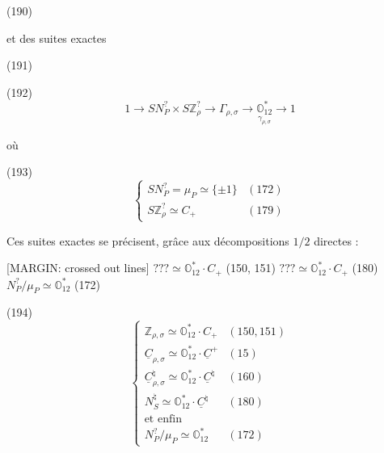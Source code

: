 \newpage


(190)

et des suites exactes

(191)

(192)
$$1 \to S N^?_P \times S\mathbb{Z}^?_\rho \to \Gamma_{\rho,\sigma} \to \underset{\gamma_{\rho,\sigma}}{\mathbb{O}_{12}^*} \to 1$$

où

(193)
$$ \begin{cases} S N^?_P = \mu_P \simeq \{\pm 1\} & (172) \\ S\mathbb{Z}^?_\rho \simeq C_+ & (179) \end{cases} $$

Ces suites exactes se précisent, grâce
aux décompositions $1/2$ directes :

[MARGIN: crossed out lines]
$??? \simeq \mathbb{O}_{12}^* \cdot C_+$ (150, 151)
$??? \simeq \mathbb{O}_{12}^* \cdot C_+$ (180)
$N^?_P / \mu_P \simeq \mathbb{O}_{12}^*$ (172)

(194)
$$ \begin{cases} \mathbb{Z}_{\rho,\sigma} \simeq \mathbb{O}_{12}^* \cdot C_+ & (150, 151) \\ \underline{C}_{\rho,\sigma} \simeq \mathbb{O}_{12}^* \cdot \underline{C}^+ & (15) \\ \underline{C}^\natural_{\rho,\sigma} \simeq \mathbb{O}_{12}^* \cdot \underline{C}^\natural & (160) \\ N^\natural_S \simeq \mathbb{O}_{12}^* \cdot \underline{C}^\natural & (180) \\ \text{et enfin} \\ N^?_P / \mu_P \simeq \mathbb{O}_{12}^* & (172) \end{cases} $$


